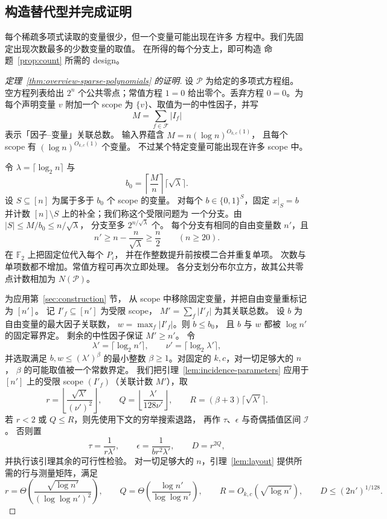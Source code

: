 \subsection{构造替代型并完成证明}\label{subsec:sparse-queries}
每个稀疏多项式读取的变量很少，但一个变量可能出现在许多
方程中。我们先固定出现次数最多的少数变量的取值。
在所得的每个分支上，即可构造
命题~\ref{prop:count} 所需的 design。

\begin{proof}[定理~\ref{thm:overview-sparse-polynomials} 的证明]
设 $\mathcal P$ 为给定的多项式方程组。
空方程列表给出 $2^n$ 个公共零点；常值方程 $1=0$
给出零个。丢弃方程 $0=0$。为每个声明变量 $v$
附加一个 scope 为 $\{v\}$、取值为一的中性因子，并写
\[
 M=\sum_{f\in\mathcal F}|I_f|
\]
表示「因子--变量」关联总数。
输入界蕴含 $M=n(\log n)^{O_{k,c}(1)}$，
且每个 scope 有 $(\log n)^{O_{k,c}(1)}$ 个变量。
不过某个特定变量可能出现在许多 scope 中。

令 $\lambda=\lceil\log_2 n\rceil$ 与
\[
 b_0=\left\lceil\frac Mn\right\rceil\lceil\sqrt\lambda\rceil.
\]
设 $S\subseteq[n]$ 为属于多于 $b_0$ 个 scope 的变量。
对每个 $b\in\{0,1\}^S$，固定 $x|_S=b$
并计数 $[n]\setminus S$ 上的补全；我们称这个受限问题为
一个分支。由 $|S|\le M/b_0\le n/\sqrt\lambda$，
分支至多 $2^{n/\sqrt\lambda}$ 个。
每个分支有相同的自由变量数 $n'$，且
\[
 n'\ge n-\frac n{\sqrt\lambda}\ge\frac n2
 \qquad(n\ge20).
\]
在 $\mathbb F_2$ 上把固定位代入每个 $P_i$，
并在作整数提升前按模二合并重复单项。
次数与单项数都不增加。常值方程可再次立即处理。
各分支划分布尔立方，故其公共零点计数相加为
$N(\mathcal P)$。

为应用第~\ref{sec:construction} 节，
从 scope 中移除固定变量，并把自由变量重标记为 $[n']$。
记 $I'_f\subseteq[n']$ 为受限 scope，
$M'=\sum_f|I'_f|$ 为其关联总数。
设 $b$ 为自由变量的最大因子关联数，
$w=\max_f|I'_f|$。则 $b\le b_0$，
且 $b$ 与 $w$ 都被 $\log n'$ 的固定幂界定。
剩余的中性因子保证 $M'\ge n'$。
令
\[
 \lambda'=\lceil\log_2 n'\rceil,\qquad
 \nu'=\lceil\log_2\lambda'\rceil,
\]
并选取满足 $b,w\le(\lambda')^\beta$ 的最小整数
$\beta\ge1$。对固定的 $k,c$，对一切足够大的 $n$，
$\beta$ 的可能取值被一个常数界定。
我们把引理~\ref{lem:incidence-parameters} 应用于
$[n']$ 上的受限 scope $(I'_f)$（关联计数 $M'$），取
\[
 r=\left\lfloor\frac{\sqrt{\lambda'}}{(\nu')^2}\right\rfloor,
 \qquad Q=\left\lfloor\frac{\lambda'}{128\nu'}\right\rfloor,
 \qquad R=(\beta+3)\lceil\sqrt{\lambda'}\rceil.
\]
若 $r<2$ 或 $Q\le R$，则先使用下文的穷举搜索退路，
再作 $\tau$、$\epsilon$ 与奇偶插值区间 $\mathcal I$。
否则置
\[
 \tau=\frac1{r\lambda'},\qquad
 \epsilon=\frac1{br^2\lambda'},\qquad D=r^{2Q},
\]
并执行该引理其余的可行性检验。
对一切足够大的 $n$，引理~\ref{lem:layout}
提供所需的行与测量矩阵，满足
\[
 r=\Theta\!\left(\frac{\sqrt{\log n'}}{(\log\log n')^2}\right),
 \qquad Q=\Theta\!\left(\frac{\log n'}{\log\log n'}\right),
 \qquad R=O_{k,c}(\sqrt{\log n'}),
 \qquad D\le(2n')^{1/128}.
\]


\end{proof}
